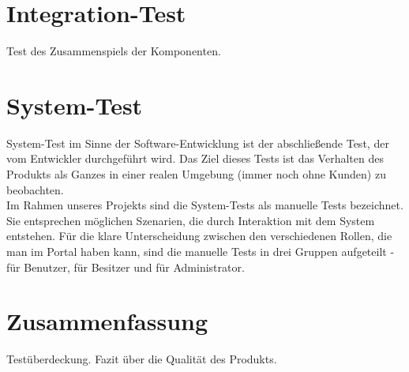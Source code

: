 \documentclass[parskip=full,11pt]{scrartcl}
\begin{document}
\section{Integration-Test} \label{integrationtest}
Test des Zusammenspiels der Komponenten.

\newpage
\section{System-Test} \label{systemtest}
System-Test im Sinne der Software-Entwicklung ist der abschließende Test, der vom Entwickler durchgeführt wird. Das Ziel dieses Tests ist das Verhalten des Produkts als Ganzes in einer realen Umgebung (immer noch ohne Kunden) zu beobachten.\\
Im Rahmen unseres Projekts sind die System-Tests als manuelle Tests bezeichnet. Sie entsprechen möglichen Szenarien, die durch Interaktion mit dem System entstehen. Für die klare Unterscheidung zwischen den verschiedenen Rollen, die man im Portal haben kann, sind die manuelle Tests in drei Gruppen aufgeteilt - für Benutzer, für Besitzer und für Administrator.

\newpage
\section{Zusammenfassung} \label{zusammenfassung}
Testüberdeckung. Fazit über die Qualität des Produkts.
\end{document}
